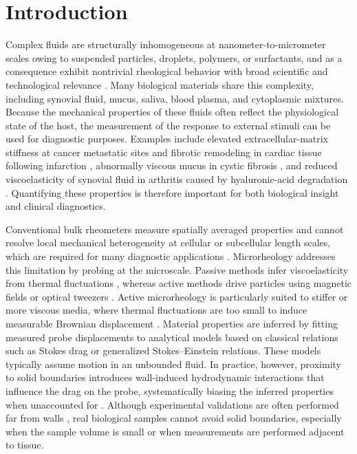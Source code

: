 \documentclass{elsarticle}
\begin{document}
\section{Introduction}
\label{sec:introduction}


Complex fluids are structurally inhomogeneous at nanometer-to-micrometer 
scales owing to suspended particles, droplets, polymers, or surfactants,
and as a consequence exhibit nontrivial rheological behavior with broad scientific and
technological relevance
\cite{osterhold2000rheological,amorim2021insights,ahuja2018rheological,
fischer2011rheology,lee2009thixotropic}.
Many biological materials share this complexity, including synovial fluid,
mucus, saliva, blood plasma, and cytoplasmic mixtures. Because the
mechanical properties of these fluids often reflect the physiological
state of the host, the measurement of the response to external stimuli can be used for diagnostic purposes. Examples include elevated extracellular-matrix stiffness at cancer metastatic sites and fibrotic
remodeling in cardiac tissue following infarction
\cite{li2018extracellular,fan2024matrix,budday2020fifty},
abnormally viscous mucus in cystic fibrosis \cite{lai2009micro}, and
reduced viscoelasticity of synovial fluid in arthritis caused by
hyaluronic-acid degradation \cite{schurz1987rheology,fam2007rheological}.
Quantifying these properties is therefore important for both biological
insight and clinical diagnostics.

Conventional bulk rheometers measure spatially averaged properties and
cannot resolve local mechanical heterogeneity at cellular or subcellular
length scales, which are required for many diagnostic applications
\cite{cox2011remodeling,roeder2004local,wullkopf2018cancer,martin2024scale}.
Microrheology addresses this limitation by probing at the microscale.
Passive methods infer viscoelasticity from thermal fluctuations
\cite{squires2010fluid,burkholder2020nonlinear,zia2018active}, whereas
active methods drive particles using magnetic fields or optical tweezers
\cite{bausch1999measurement,rich2011nonlinear,yao2009microrheology,robertson2018optical,radiom2021magnetic}.
Active microrheology is particularly suited to stiffer or more viscous
media, where thermal fluctuations are too small to induce measurable
Brownian displacement \cite{xia2018microrheology,mao2022passive}.
Material properties are inferred by fitting measured probe displacements
to analytical models based on classical relations such as Stokes drag or
generalized Stokes--Einstein relations. These models typically assume
motion in an unbounded fluid. In practice, however, proximity to solid
boundaries introduces wall-induced hydrodynamic interactions that
influence the drag on the probe, systematically biasing the  inferred
properties when unaccounted for \cite{geonzon2021effect}. Although
experimental validations are often performed far from walls
\cite{wilson2009passive,besseris1999rotational,radiom2021magnetic},
real biological samples cannot avoid solid boundaries, especially when
the sample volume is small or when measurements are performed adjacent to
tissue.
\end{document}
